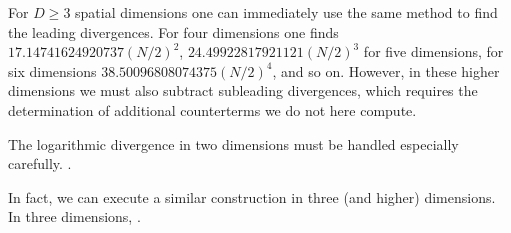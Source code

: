 For $D\geq3$ spatial dimensions one can immediately use the same method to find the leading divergences.
For four dimensions one finds $17.14741624920737 (N/2)^2$, $24.49922817921121 (N/2)^3$ for five dimensions, for six dimensions $38.50096808074375 (N/2)^4$, and so on.  However, in these higher dimensions we must also subtract subleading divergences, which requires the determination of additional counterterms we do not here compute.


The logarithmic divergence in two dimensions must be handled especially carefully.
.

In fact, we can execute a similar construction in three (and higher) dimensions.  In three dimensions, .
